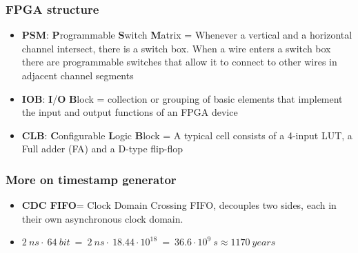 \documentclass[aspectratio=169]{beamer}
\begin{document}
	\begin{frame}[noframenumbering]
		\frametitle{FPGA structure}
		\begin{itemize}
			\item \textbf{PSM}: \textbf{P}rogrammable \textbf{S}witch \textbf{M}atrix = Whenever a vertical and a horizontal channel intersect, there is a switch box. When a wire enters a switch box there are programmable switches that allow it to connect to other wires in adjacent channel segments
			\item \textbf{IOB}: \textbf{I}/\textbf{O} \textbf{B}lock = collection or grouping of basic elements that implement the input and output functions of an FPGA device
			\item \textbf{CLB}: \textbf{C}onfigurable \textbf{L}ogic \textbf{B}lock = A typical cell consists of a 4-input LUT, a Full adder (FA) and a D-type flip-flop
		\end{itemize}
	\end{frame}

	\begin{frame}[noframenumbering]
		\frametitle{More on timestamp generator}
		\begin{center}
			\begin{itemize}
				\item \textbf{CDC FIFO}= Clock Domain Crossing FIFO, decouples two sides, each in their own asynchronous clock domain.
				\item $2 \: ns \cdot \: 64 \: bit \: =\: 2 \: ns \cdot \: 18.44\cdot10^{18} \: = \: 36.6\cdot10^{9} \: s \approx 1170 \: years$
			\end{itemize}
		\end{center}
	\end{frame}

		
	
\end{document}
